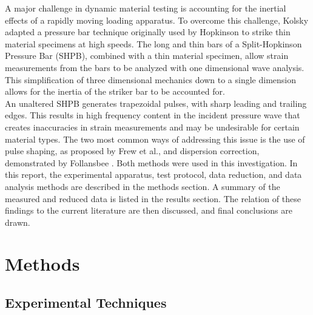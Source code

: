 \documentclass[12pt]{article}
\begin{document}
A major challenge in dynamic material testing is accounting for the inertial effects of a rapidly moving loading apparatus. To overcome this challenge, Kolsky adapted a pressure bar technique originally used by Hopkinson to strike thin material specimens at high speeds\cite{Kolsky}. The long and thin bars of a Split-Hopkinson Pressure Bar (SHPB), combined with a thin material specimen, allow strain measurements from the bars to be analyzed with one dimensional wave analysis. This simplification of three dimensional mechanics down to a single dimension allows for the inertia of the striker bar to be accounted for.\\

An unaltered SHPB generates trapezoidal pulses, with sharp leading and trailing edges. This results in high frequency content in the incident pressure wave that creates inaccuracies in strain measurements and may be undesirable for certain material types. The two most common ways of addressing this issue is the use of pulse shaping, as proposed by Frew et al., and dispersion correction, demonstrated by Follansbee \cite{Frew2002} \cite{Follansbee}. Both methods were used in this investigation. In this report, the experimental apparatus, test protocol, data reduction, and data analysis methods are described in the methods section. A summary of the measured and reduced data is listed in the results section. The relation of these findings to the current literature are then discussed, and final conclusions are drawn. \\



\section{Methods}

\subsection{Experimental Techniques} 
\end{document}

